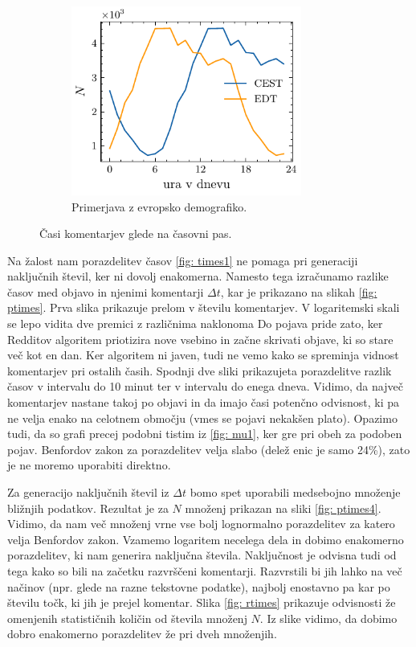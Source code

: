 \documentclass[11pt, oneside]{article}
\theoremstyle{definition}
\begin{document}
\begin{figure}[h!]
\begin{subfigure}[b]{0.49\textwidth}
        \includegraphics[width=0.83\textwidth]{reddit_eu_dist.pdf}
        \caption{Primerjava z evropsko demografiko.}
        \label{fig: times3}
    \end{subfigure}
    \caption{Časi komentarjev glede na časovni pas.}
    \label{fig: times}
\end{figure}

\newpage
Na žalost nam porazdelitev časov \ref{fig: times1} ne pomaga pri generaciji naključnih števil, ker
ni dovolj enakomerna. Namesto tega izračunamo razlike časov med objavo in njenimi komentarji $\Delta t$, kar je
prikazano na slikah \ref{fig: ptimes}. Prva slika prikazuje prelom v številu komentarjev.
V logaritemski skali se lepo vidita dve premici z različnima naklonoma
Do pojava pride zato, ker Redditov algoritem priotizira nove vsebino in začne skrivati objave, ki so stare več kot en dan.
Ker algoritem ni javen, tudi ne vemo kako se spreminja vidnost komentarjev pri ostalih časih.
Spodnji dve sliki prikazujeta porazdelitve razlik časov v intervalu do 10 minut ter v intervalu do enega dneva.
Vidimo, da največ komentarjev nastane takoj po objavi in da imajo časi potenčno odvisnost, ki
pa ne velja enako na celotnem območju (vmes se pojavi nekakšen plato).
Opazimo tudi, da so grafi precej podobni tistim iz \ref{fig: mu1}, ker gre pri obeh za podoben pojav.
Benfordov zakon za porazdelitev velja slabo (delež enic je samo 24\%), zato je ne moremo uporabiti direktno.

Za generacijo naključnih števil iz $\Delta t$ bomo spet uporabili medsebojno množenje bližnjih podatkov.
Rezultat je za $N$ množenj prikazan na sliki \ref{fig: ptimes4}. Vidimo, da nam več množenj vrne vse bolj
lognormalno porazdelitev za katero velja Benfordov zakon. Vzamemo logaritem necelega dela in dobimo enakomerno
porazdelitev, ki nam generira naključna števila. Naključnost je odvisna tudi od tega kako so bili na
začetku razvrščeni komentarji. Razvrstili bi jih lahko na več načinov (npr. glede na razne tekstovne
podatke), najbolj enostavno pa kar po številu točk, ki jih je prejel komentar.
Slika \ref{fig: rtimes} prikazuje odvisnosti že omenjenih statističnih količin od števila množenj $N$.
Iz slike vidimo, da dobimo dobro enakomerno porazdelitev že pri dveh množenjih.
\end{document}
